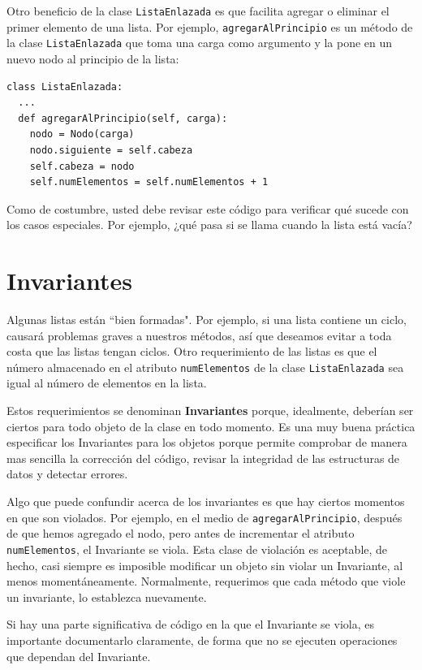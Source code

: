 Otro beneficio de la clase \texttt{ListaEnlazada} es que facilita agregar o eliminar
el primer elemento de una lista. Por ejemplo, \texttt{agregarAlPrincipio} es un método
de la clase \texttt{ListaEnlazada} que toma una carga como argumento y la pone
en un nuevo nodo al principio de la lista:

\beforeverb
\begin{verbatim}
class ListaEnlazada:
  ...
  def agregarAlPrincipio(self, carga):
    nodo = Nodo(carga)
    nodo.siguiente = self.cabeza
    self.cabeza = nodo
    self.numElementos = self.numElementos + 1
\end{verbatim}
\afterverb
%
Como de costumbre, usted debe revisar este código para verificar qué sucede con
los casos especiales. Por ejemplo, ¿qué pasa si se llama cuando la lista está vacía?


\section {Invariantes}

Algunas listas están ``bien formadas".  Por ejemplo, si una lista contiene un 
ciclo, causará problemas graves a nuestros métodos, así que deseamos 
evitar a toda costa que las listas tengan ciclos. Otro requerimiento de las listas
es que el número almacenado en el atributo \texttt{numElementos} de la clase
 \texttt{ListaEnlazada} sea igual al número de elementos en la lista.

Estos requerimientos se denominan  {\bf Invariantes} porque, idealmente, 
deberían ser ciertos para todo objeto de la clase en todo momento. Es una muy 
buena práctica especificar los Invariantes para los objetos porque permite
comprobar de manera mas sencilla la corrección del código, revisar la 
integridad de las estructuras de datos y detectar errores.

Algo que puede confundir acerca de los invariantes es que hay ciertos momentos
en que son violados. Por ejemplo, en el medio de  \texttt{agregarAlPrincipio}, 
después de que hemos agregado el nodo, pero antes de incrementar el atributo
 \texttt{numElementos}, el Invariante se viola. Esta clase de violación
es aceptable, de hecho, casi siempre es imposible modificar un objeto 
sin violar un Invariante, al menos momentáneamente. Normalmente, requerimos
que cada método que viole un invariante, lo establezca nuevamente.

Si hay una parte significativa de código en la que el Invariante se viola,
es importante documentarlo claramente, de forma que no se ejecuten operaciones
que dependan del Invariante.

